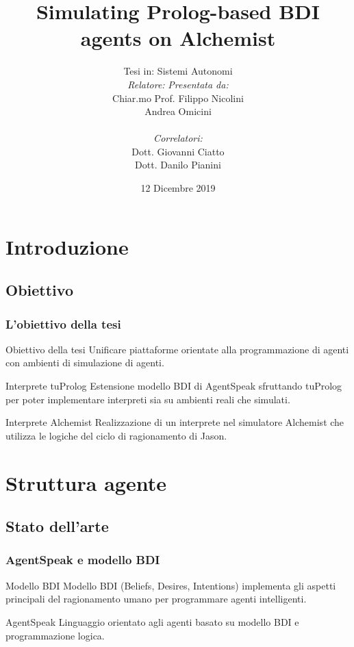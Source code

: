 \documentclass[handout]{beamer}\mode<presentation>{\usetheme{AMSCesenaBleu}}
\title[Prolog BDI agents on Alchemist]{Simulating Prolog-based BDI agents on Alchemist}
\author[Filippo Nicolini]{Tesi in: Sistemi Autonomi\\
[0.5cm]
\textit{Relatore:} \hspace{6.55cm} \textit{Presentata da:}\\
Chiar.mo Prof. \hspace{5.5cm} Filippo Nicolini\\
Andrea Omicini \hspace{7.6cm} \phantom{g}\\
\textit{\\Correlatori:} \hspace{8.25cm} \phantom{g}\\
Dott. Giovanni Ciatto \hspace{6.5cm} \phantom{g}\\
Dott. Danilo Pianini \hspace{6.7cm} \phantom{g}\\
}
\institute[]{
\textsc{Alma Mater Studiorum} -- Università di Bologna \\
Campus di Cesena}
\date{12 Dicembre 2019}
\begin{document}
\maketitle


\section{Introduzione}

\subsection{Obiettivo}
\begin{frame}
\frametitle{L'obiettivo della tesi}
\begin{block}{Obiettivo della tesi}
\alert{Unificare} piattaforme orientate alla \alert{programmazione di agenti} con ambienti di \alert{simulazione di agenti}.
\end{block}

\begin{block}{Interprete tuProlog}
Estensione modello BDI di AgentSpeak sfruttando tuProlog per poter implementare interpreti sia su ambienti reali che simulati.
\end{block}

\begin{block}{Interprete Alchemist}
Realizzazione di un interprete nel simulatore Alchemist che utilizza le logiche del ciclo di ragionamento di Jason.
\end{block}
\end{frame}


\section{Struttura agente}

\subsection{Stato dell'arte}

\begin{frame}
\frametitle{AgentSpeak e modello BDI}
\begin{block}{Modello BDI}
Modello BDI (Beliefs, Desires, Intentions) implementa gli aspetti principali del ragionamento umano per programmare agenti intelligenti.
\end{block}
\begin{block}{AgentSpeak}
Linguaggio orientato agli agenti basato su modello BDI e programmazione logica.
\end{block}
\end{frame}
\end{document}
